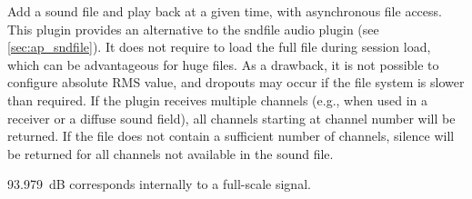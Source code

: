 Add a sound file and play back at a given time, with asynchronous file access.
%
This plugin provides an alternative to the sndfile audio plugin
(see \ref{sec:ap_sndfile}). It does not require to load the full
file during session load, which can be advantageous for huge files. As
a drawback, it is not possible to configure absolute RMS value, and
dropouts may occur if the file system is slower than required.
%
If the plugin receives multiple channels (e.g., when used in a
receiver or a diffuse sound field), all channels starting at channel
number  will be returned. If the file does not contain a
sufficient number of channels, silence will be returned for all
channels not available in the sound file.





93.979~dB corresponds internally to a full-scale signal.
